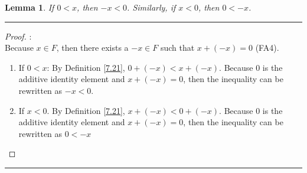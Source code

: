 \documentclass[openany, amssymb, psamsfonts]{amsart}
\newtheorem{lem}{Lemma}[section]
\theoremstyle{definition}
\numberwithin{equation}{section}
\begin{document}
\begin{lem}
\label{7.23}
	If $0 < x$, then $-x < 0$.  Similarly, if $x < 0$, then $0 < -x$.
\end{lem}
\vspace{4pt}     \hrule   \vspace{4pt}
\begin{proof}:\\
Because $x\in F$, then there exists a $-x \in F$ such that $x+ (-x) = 0$ (FA4).
\begin{enumerate}
    \item If $0<x$: By Definition \ref{7.21}, $0+(-x) < x + (-x)$. Because $0$ is the additive identity element and $x+ (-x) = 0$, then the inequality can be rewritten as $-x < 0$.
    \item If $x<0$. By Definition \ref{7.21}, $x+(-x) < 0 + (-x)$. Because $0$ is the additive identity element and $x+ (-x) = 0$, then the inequality can be rewritten as $0 < -x$
\end{enumerate}
 \end{proof}
\vspace{4pt}     \hrule   \vspace{4pt}
\end{document}
